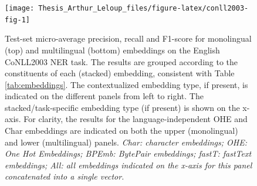 \documentclass[12pt,a4paper,]{book}
\begin{document}
\begin{figure}

{\centering \texttt{[image: Thesis\_Arthur\_Leloup\_files/figure-latex/conll2003-fig-1]} 

}

\caption{Test-set micro-average precision, recall and F1-score for monolingual (top) and multilingual (bottom) embeddings on the English CoNLL2003 NER task. The results are grouped according to the constituents of each (stacked) embedding, consistent with Table \ref{tab:embeddings}. The contextualized embedding type, if present, is indicated on the different panels from left to right. The stacked/task-specific embedding type (if present) is shown on the x-axis. For clarity, the results for the language-independent OHE and Char embeddings are indicated on both the upper (monolingual) and lower (multilingual) panels. \emph{Char: character embeddings; OHE: One Hot Embeddings; BPEmb: BytePair embeddings; fastT: fastText embeddings; All: all embeddings indicated on the x-axis for this panel concatenated into a single vector.}}\label{fig:conll2003-fig}
\end{figure}
\end{document}
